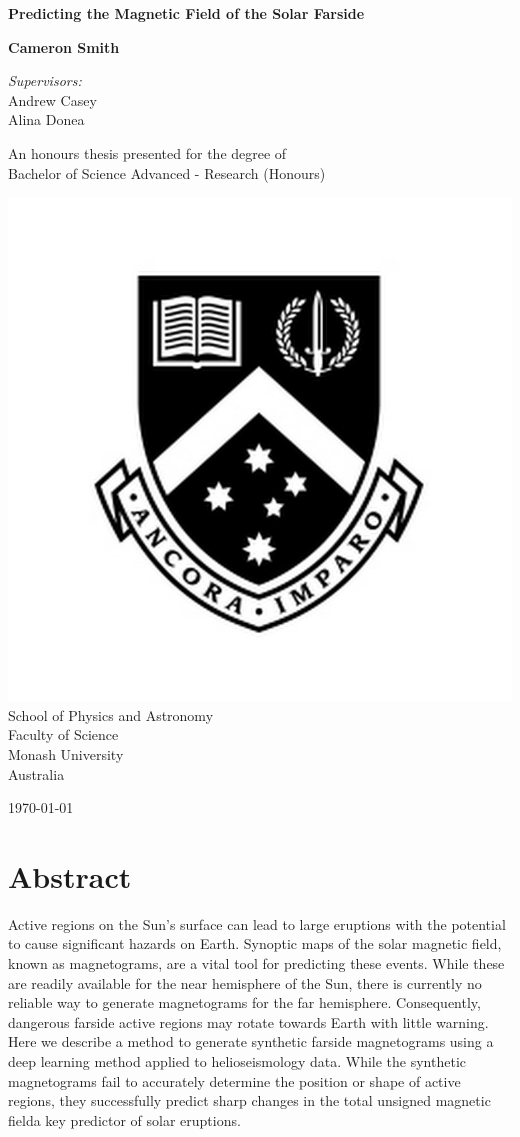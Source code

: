 \documentclass[11pt,a4paper,onecolumn]{report}
\begin{document}
\begin{titlepage}
  \begin{center}
    \vspace*{2cm}
    \Huge
    \textbf{Predicting the Magnetic Field of the Solar Farside}

    \vspace{2cm}
    \LARGE
    \textbf{Cameron Smith}

    \vspace{0.8cm}
    \Large \textit{Supervisors:}\\
    Andrew Casey\\
    Alina Donea

    \vfill
    \large
    An honours thesis presented for the degree of\\
    Bachelor of Science Advanced - Research (Honours)

    \vspace{0.3cm}
    \includegraphics[width=0.2\linewidth]{"Monash_Logo"}\\
    School of Physics and Astronomy\\
    Faculty of Science\\
    Monash University\\
    Australia

    \vspace{0.5cm}

    \today

  \end{center}
\end{titlepage}

\chapter*{Abstract}
Active regions on the Sun's surface can lead to large eruptions with the
potential to cause significant hazards on Earth. Synoptic maps of the solar
magnetic field, known as magnetograms, are a vital tool for predicting these
events. While these are readily available for the near hemisphere of the Sun,
there is currently no reliable way to generate magnetograms for the far
hemisphere. Consequently, dangerous farside active regions may rotate towards
Earth with little warning. Here we describe a method to generate synthetic
farside magnetograms using a deep learning method applied to helioseismology
data. While the synthetic magnetograms fail to accurately determine the position
or shape of active regions, they successfully predict sharp changes in the total
unsigned magnetic field\textemdash a key predictor of solar eruptions.
\end{document}

